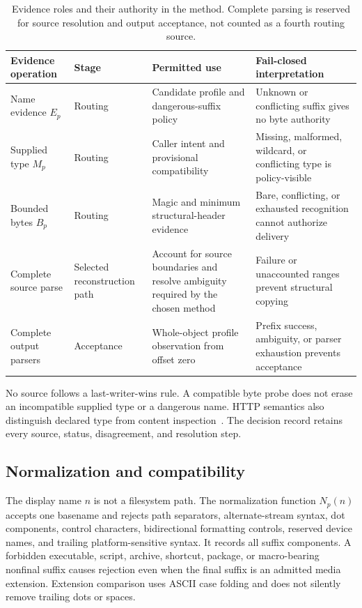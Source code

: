 \begin{table}[t]
\centering
\caption{Evidence roles and their authority in the method. Complete parsing is
reserved for source resolution and output acceptance, not counted as a fourth
routing source.}
\label{tab:evidence-strength}
\small
\begin{tabularx}{\textwidth}{L{0.22\textwidth}L{0.22\textwidth}YY}
\toprule
Evidence operation & Stage & Permitted use & Fail-closed interpretation \\
\midrule
Name evidence $E_p$ & Routing & Candidate profile and dangerous-suffix policy & Unknown or conflicting suffix gives no byte authority \\
Supplied type $M_p$ & Routing & Caller intent and provisional compatibility & Missing, malformed, wildcard, or conflicting type is policy-visible \\
Bounded bytes $B_p$ & Routing & Magic and minimum structural-header evidence & Bare, conflicting, or exhausted recognition cannot authorize delivery \\
Complete source parse & Selected reconstruction path & Account for source boundaries and resolve ambiguity required by the chosen method & Failure or unaccounted ranges prevent structural copying \\
Complete output parsers & Acceptance & Whole-object profile observation from offset zero & Prefix success, ambiguity, or parser exhaustion prevents acceptance \\
\bottomrule
\end{tabularx}
\end{table}

No source follows a last-writer-wins rule. A compatible byte probe does not
erase an incompatible supplied type or a dangerous name. HTTP semantics also
distinguish declared type from content inspection~\cite{rfc9110}. The decision
record retains every source, status, disagreement, and resolution step.

\subsection{Normalization and compatibility}

The display name $n$ is not a filesystem path. The normalization function
$N_p(n)$ accepts one basename and rejects path separators, alternate-stream
syntax, dot components, control characters, bidirectional formatting controls,
reserved device names, and trailing platform-sensitive syntax. It records all
suffix components. A forbidden executable, script, archive, shortcut, package,
or macro-bearing nonfinal suffix causes rejection even when the final suffix is
an admitted media extension. Extension comparison uses ASCII case folding and
does not silently remove trailing dots or spaces.

